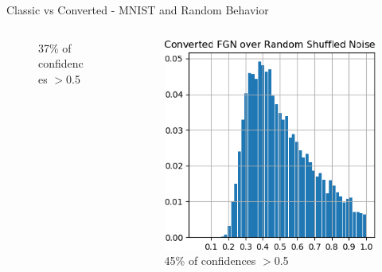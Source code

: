 \documentclass{beamer}
\begin{document}
\begin{frame}{Classic vs Converted - MNIST and Random Behavior}
\begin{columns}
\begin{column}{.33\textwidth}
\begin{figure}
        \centering \tiny{37\% of confidences $>$0.5}
    \end{figure}
    \end{column}
    \begin{column}{.33\textwidth}
    \begin{figure}
        \centering
        \includegraphics[width=.91\textwidth]{images/mnist-behavior/converted-hist-shuffled.png}
        \centering \tiny{45\% of confidences $>$0.5}
    \end{figure}
    \end{column}
    \end{columns}
    
    
\end{frame}
\end{document}

